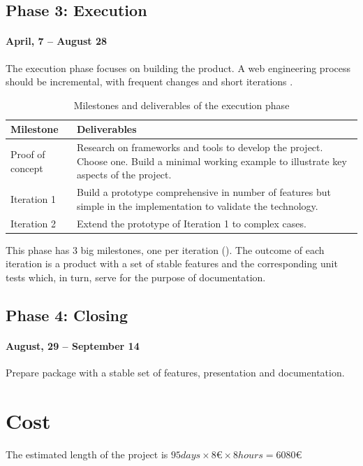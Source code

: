 \subsection*{Phase 3: Execution}
\paragraph{April, 7 -- August 28}
The execution phase focuses on building the product. 
A web engineering process should be incremental, with frequent changes and short iterations \cite{Kappel:2006}.

\begin{table}[htb]
    \centering
    \begin{tabular}{| l | p{11cm} |}
    \hline
    Milestone & Deliverables \\
    \hline
    Proof of concept & Research on frameworks and tools to develop the project. Choose one. Build a minimal working example to illustrate key aspects of the project. \\ \hline
    Iteration 1 & Build a prototype comprehensive in number of features but simple in the implementation to validate the technology. \\ \hline
    Iteration 2 & Extend the prototype of Iteration 1 to complex cases. \\
    \hline
    \end{tabular}
    \caption{Milestones and deliverables of the execution phase}
    \label{tab:milestones}
\end{table}

This phase has 3 big milestones, one per iteration (). 
The outcome of each iteration is a product with a set of stable features and the corresponding unit tests which, in turn, serve for the purpose of documentation.

\subsection*{Phase 4: Closing}
\paragraph{August, 29 -- September 14}
Prepare package with a stable set of features, presentation and documentation.

\FloatBarrier

\section{Cost}
\label{sec:budget}
The estimated length of the project is $95 days \times 8 \euro{} \times 8 hours = 6080 \euro{} $

